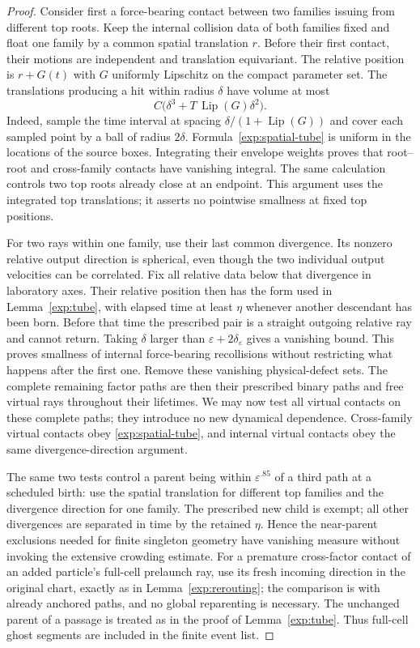 \begin{proof}
Consider first a force-bearing contact between two families issuing from different top
roots.  Keep the internal collision data of both families fixed and float
one family by a common spatial translation $r$.  Before their first
contact, their motions are independent and translation equivariant.
The relative position is $r+G(t)$ with $G$ uniformly Lipschitz on the
compact parameter set.  The translations producing a hit within radius
$\delta$ have volume at most
\begin{equation}
\label{exp:spatial-tube}
 C\bigl(\delta^3+T\,\operatorname{Lip}(G)\delta^2\bigr).
\end{equation}
Indeed, sample the time interval at spacing
$\delta/(1+\operatorname{Lip}(G))$ and cover each sampled point by a ball
of radius $2\delta$.  Formula~\eqref{exp:spatial-tube} is uniform in the
locations of the source boxes.  Integrating their envelope weights proves
that root--root and cross-family contacts have vanishing integral.
The same calculation controls two top roots already close at an endpoint.
This argument uses the integrated top translations; it asserts no
pointwise smallness at fixed top positions.

For two rays within one family, use their last common divergence.  Its
nonzero relative output direction is spherical, even though the two
individual output velocities can be correlated.  Fix all relative data
below that divergence in laboratory axes.  Their relative position then
has the form used in Lemma~\ref{exp:tube}, with elapsed time at least
$\eta$ whenever another descendant has been born.  Before that time the
prescribed pair is a straight outgoing relative ray and cannot return.
Taking $\delta$ larger than
$\varepsilon+2\delta_\varepsilon$ gives a vanishing bound.  This proves
smallness of internal force-bearing recollisions without restricting what
happens after the first one.  Remove these vanishing physical-defect sets.
The complete remaining factor paths are then their prescribed binary
paths and free virtual rays throughout their lifetimes.  We may now test
all virtual contacts on these complete paths; they introduce no new
dynamical dependence.  Cross-family virtual contacts obey
\eqref{exp:spatial-tube}, and internal virtual contacts obey the same
divergence-direction argument.

The same two tests control a parent being within
$\varepsilon^{.85}$ of a third path at a scheduled birth: use the spatial
translation for different top families and the divergence direction for
one family.  The prescribed new child is exempt; all other divergences
are separated in time by the retained $\eta$.  Hence the near-parent
exclusions needed for finite singleton geometry have vanishing measure
without invoking the extensive crowding estimate.  For a premature
cross-factor contact of an added particle's full-cell prelaunch ray, use
its fresh incoming direction in the original chart, exactly as in
Lemma~\ref{exp:rerouting}; the comparison is with already anchored paths,
and no global reparenting is necessary.  The unchanged parent of a passage
is treated as in the proof of Lemma~\ref{exp:tube}.  Thus full-cell ghost
segments are included in the finite event list.


\end{proof}
